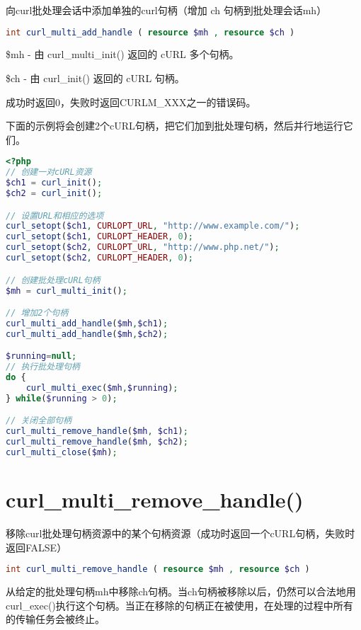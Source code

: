向curl批处理会话中添加单独的curl句柄（增加 ch 句柄到批处理会话mh）


\begin{lstlisting}[language=PHP]
int curl_multi_add_handle ( resource $mh , resource $ch )
\end{lstlisting}

\begin{compactitem}
\item \$mh - 由 curl\_multi\_init() 返回的 cURL 多个句柄。
\item \$ch - 由 curl\_init() 返回的 cURL 句柄。
\end{compactitem}

成功时返回0，失败时返回CURLM\_XXX之一的错误码。

下面的示例将会创建2个cURL句柄，把它们加到批处理句柄，然后并行地运行它们。

\begin{lstlisting}[language=PHP]
<?php
// 创建一对cURL资源
$ch1 = curl_init();
$ch2 = curl_init();

// 设置URL和相应的选项
curl_setopt($ch1, CURLOPT_URL, "http://www.example.com/");
curl_setopt($ch1, CURLOPT_HEADER, 0);
curl_setopt($ch2, CURLOPT_URL, "http://www.php.net/");
curl_setopt($ch2, CURLOPT_HEADER, 0);

// 创建批处理cURL句柄
$mh = curl_multi_init();

// 增加2个句柄
curl_multi_add_handle($mh,$ch1);
curl_multi_add_handle($mh,$ch2);

$running=null;
// 执行批处理句柄
do {
    curl_multi_exec($mh,$running);
} while($running > 0);

// 关闭全部句柄
curl_multi_remove_handle($mh, $ch1);
curl_multi_remove_handle($mh, $ch2);
curl_multi_close($mh);
\end{lstlisting}

\section{curl\_multi\_remove\_handle()}

移除curl批处理句柄资源中的某个句柄资源（成功时返回一个cURL句柄，失败时返回FALSE）

\begin{lstlisting}[language=PHP]
int curl_multi_remove_handle ( resource $mh , resource $ch )
\end{lstlisting}

从给定的批处理句柄mh中移除ch句柄。当ch句柄被移除以后，仍然可以合法地用curl\_exec()执行这个句柄。当正在移除的句柄正在被使用，在处理的过程中所有的传输任务会被终止。

